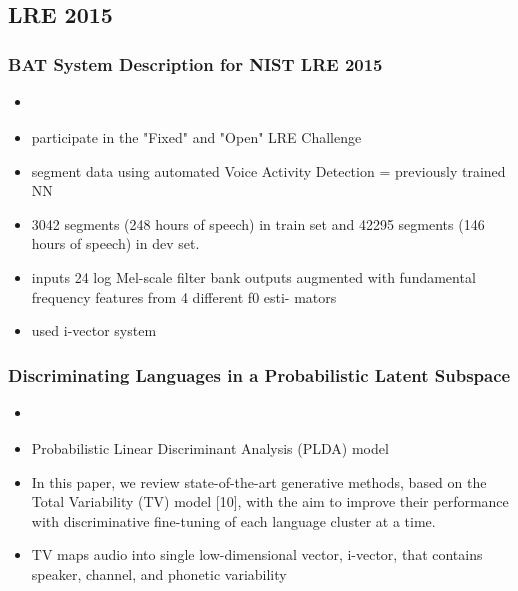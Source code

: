 \subsection{LRE 2015}

    \subsubsection{BAT System Description for NIST LRE 2015}
    \begin{itemize}
        \item \cite{plchot2016bat}
        \item participate in the "Fixed" and "Open" LRE Challenge
        \item segment data using automated Voice Activity Detection = previously trained NN
        \item 3042 segments (248 hours of speech) in train set and 42295 segments (146 hours of speech) in dev set.
        \item inputs 24 log Mel-scale filter bank outputs augmented with fundamental frequency features from 4 different f0 esti- mators
        \item used i-vector system
        
    \end{itemize}
    
    \subsubsection{Discriminating Languages in a Probabilistic Latent Subspace}
    \begin{itemize}
        \item \cite{sizovdiscriminating}
        \item Probabilistic Linear Discriminant Analysis (PLDA) model
        \item In this paper, we review state-of-the-art generative methods, based on the Total Variability (TV) model [10], with the aim to improve their performance with discriminative fine-tuning of each language cluster at a time.
        \item TV maps audio into single low-dimensional vector, i-vector, that contains speaker, channel, and phonetic variability
        
    \end{itemize}
    
